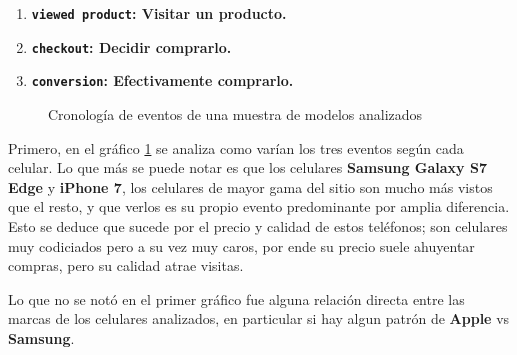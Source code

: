\documentclass[a4paper]{article}
\begin{document}
\begin{enumerate}
\item \textbf{\texttt{viewed product}: Visitar un producto.}
\item \textbf{\texttt{checkout}: Decidir comprarlo.}
\item \textbf{\texttt{conversion}: Efectivamente comprarlo.}
\end{enumerate}

\begin{figure}[h!]
	\caption{Cronología de eventos de una muestra de modelos analizados}
	\label{fig:prominentes}
\end{figure}

Primero, en el gráfico \ref{fig:prominentes} se analiza como varían los tres eventos según cada celular. Lo que más se puede notar es que los celulares \textbf{Samsung Galaxy S7 Edge} y \textbf{iPhone 7}, los celulares de mayor gama del sitio son mucho más vistos que el resto, y que verlos es su propio evento predominante por amplia diferencia. Esto se deduce que sucede por el precio y calidad de estos teléfonos; son celulares muy codiciados pero a su vez muy caros, por ende su precio suele ahuyentar compras, pero su calidad atrae visitas.

Lo que no se notó en el primer gráfico fue alguna relación directa entre las marcas de los celulares analizados, en particular si hay algun patrón de \textbf{Apple} vs \textbf{Samsung}.
\end{document}
